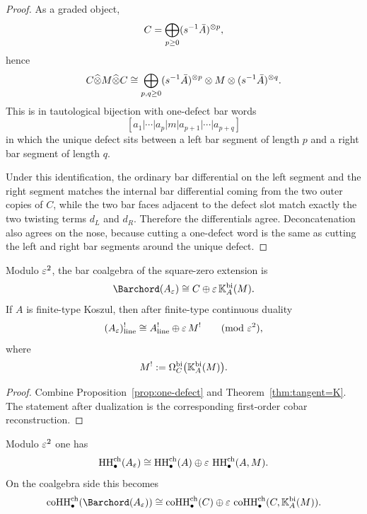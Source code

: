 \begin{proof}
As a graded object,
\[
C=\bigoplus_{p\geq 0} (s^{-1}\bar A)^{\otimes p},
\]
hence
\[
C\widehat\otimes M\widehat\otimes C
\cong
\bigoplus_{p,q\geq 0}
(s^{-1}\bar A)^{\otimes p}\otimes M\otimes(s^{-1}\bar A)^{\otimes q}.
\]
This is in tautological bijection with one-defect bar words
\[
[a_1|\cdots|a_p|m|a_{p+1}|\cdots|a_{p+q}]
\]
in which the unique defect sits between a left bar segment of length $p$ and a right bar segment of
length $q$.

Under this identification, the ordinary bar differential on the left segment and the right segment
matches the internal bar differential coming from the two outer copies of $C$, while the two bar
faces adjacent to the defect slot match exactly the two twisting terms $d_L$ and $d_R$.
Therefore the differentials agree. Deconcatenation also agrees on the nose, because cutting a
one-defect word is the same as cutting the left and right bar segments around the unique defect.
\end{proof}

\begin{corollary}
\ClaimStatusProvedHere
\label{cor:infdual}
Modulo $\varepsilon^2$, the bar coalgebra of the square-zero extension is
\[
\Barchord(A_\eps)\cong C\oplus \eps\,\KK_A^{\mathrm{bi}}(M).
\]
If $A$ is finite-type Koszul, then after finite-type continuous duality
\[
(A_\varepsilon)^!_{\mathrm{line}}\cong A^!_{\mathrm{line}}\oplus \varepsilon\, M^!
\qquad (\mathrm{mod}\ \varepsilon^2),
\]
where
\[
M^!:=\Omega_C^{\mathrm{bi}}\bigl(\mathbb{K}_A^{\mathrm{bi}}(M)\bigr).
\]
\end{corollary}

\begin{proof}
Combine Proposition~\ref{prop:one-defect} and Theorem~\ref{thm:tangent=K}. The statement after
dualization is the corresponding first-order cobar reconstruction.
\end{proof}

\begin{proposition}
\ClaimStatusProvedHere
\label{prop:infann}
Modulo $\varepsilon^2$ one has
\[
\operatorname{HH}^{\mathrm{ch}}_\bullet(A_\varepsilon)
\cong
\operatorname{HH}^{\mathrm{ch}}_\bullet(A)\oplus \varepsilon\, \operatorname{HH}^{\mathrm{ch}}_\bullet(A,M).
\]
On the coalgebra side this becomes
\[
\coHoch^{\mathrm{ch}}_\bullet(\Barchord(A_\eps))
\cong
\coHoch^{\mathrm{ch}}_\bullet(C)\oplus \eps\,
\coHoch^{\mathrm{ch}}_\bullet(C,\KK_A^{\mathrm{bi}}(M)).
\]
\end{proposition}

